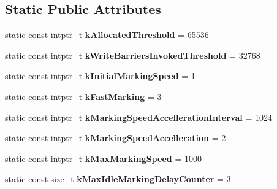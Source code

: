 \subsection*{Static Public Attributes}
\begin{DoxyCompactItemize}
\item 
static const intptr\+\_\+t {\bfseries k\+Allocated\+Threshold} = 65536\hypertarget{classv8_1_1internal_1_1_incremental_marking_a0b9aa6fc7e0d7d764710676195bd0ee4}{}\label{classv8_1_1internal_1_1_incremental_marking_a0b9aa6fc7e0d7d764710676195bd0ee4}

\item 
static const intptr\+\_\+t {\bfseries k\+Write\+Barriers\+Invoked\+Threshold} = 32768\hypertarget{classv8_1_1internal_1_1_incremental_marking_ac3610ac5228196232aa614912951da0e}{}\label{classv8_1_1internal_1_1_incremental_marking_ac3610ac5228196232aa614912951da0e}

\item 
static const intptr\+\_\+t {\bfseries k\+Initial\+Marking\+Speed} = 1\hypertarget{classv8_1_1internal_1_1_incremental_marking_ae510a9cfb5e6e34d466919602ca77f0c}{}\label{classv8_1_1internal_1_1_incremental_marking_ae510a9cfb5e6e34d466919602ca77f0c}

\item 
static const intptr\+\_\+t {\bfseries k\+Fast\+Marking} = 3\hypertarget{classv8_1_1internal_1_1_incremental_marking_ae884387d0494cd706985806a542c2f1c}{}\label{classv8_1_1internal_1_1_incremental_marking_ae884387d0494cd706985806a542c2f1c}

\item 
static const intptr\+\_\+t {\bfseries k\+Marking\+Speed\+Accelleration\+Interval} = 1024\hypertarget{classv8_1_1internal_1_1_incremental_marking_a8d816c8b5386ebdb21a2955a3bc9c5bb}{}\label{classv8_1_1internal_1_1_incremental_marking_a8d816c8b5386ebdb21a2955a3bc9c5bb}

\item 
static const intptr\+\_\+t {\bfseries k\+Marking\+Speed\+Accelleration} = 2\hypertarget{classv8_1_1internal_1_1_incremental_marking_a9fcfb82398bbce57562733a5db68da14}{}\label{classv8_1_1internal_1_1_incremental_marking_a9fcfb82398bbce57562733a5db68da14}

\item 
static const intptr\+\_\+t {\bfseries k\+Max\+Marking\+Speed} = 1000\hypertarget{classv8_1_1internal_1_1_incremental_marking_a314e6737e94addc5ebe5c45583691bfe}{}\label{classv8_1_1internal_1_1_incremental_marking_a314e6737e94addc5ebe5c45583691bfe}

\item 
static const size\+\_\+t {\bfseries k\+Max\+Idle\+Marking\+Delay\+Counter} = 3\hypertarget{classv8_1_1internal_1_1_incremental_marking_ad2c3253f9a5eef8208d4cdd23d253837}{}\label{classv8_1_1internal_1_1_incremental_marking_ad2c3253f9a5eef8208d4cdd23d253837}

\end{DoxyCompactItemize}
